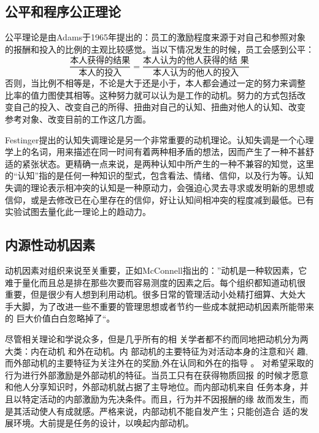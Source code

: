 \documentclass[12pt,a4paper]{ctexart}
\begin{document}
\subsection{公平和程序公正理论}
公平理论是由Adams于1965年提出的：员工的激励程度来源于对自己和参照对象
的报酬和投入的比例的主观比较感觉。当以下情况发生的时候，员工会感到公平：
$$\frac{\text{本人获得的结果}}{\text{本人的投入}} = \frac{\text{本人认为的他人获得的结
  果}}{\text{本人认为的他人的投入}}$$
否则，当比例不相等是，不论是大于还是小于，本人都会通过一定的努力来调整
比率的值力图使其相等。这种努力就可以认为是工作的动机。努力的方式包括改
变自己的投入、改变自己的所得、扭曲对自己的认知、扭曲对他人的认知、改变
参考对象、改变目前的工作这几方面\cite{adams1965ise}。

Festinger提出的认知失调理论是另一个非常重要的动机理论。认知失调是一个心理学上的名词，用来描述在同一时间有着两种相矛盾的想法，因而产生了一种不甚舒适的紧张状态。更精确一点来说，是两种认知中所产生的一种不兼容的知觉，这里的“认知”指的是任何一种知识的型式，包含看法、情绪、信仰，以及行为等。认知失调的理论表示相冲突的认知是一种原动力，会强迫心灵去寻求或发明新的思想或信仰，或是去修改已在心里存在的信仰，好让认知间相冲突的程度减到最低。已有实验试图去量化此一理论上的趋动力\cite{aronson1969tcd}。

\subsection{内源性动机因素}
动机因素对组织来说至关重要，正如McConnell指出的：”动机是一种软因素，它
难于量化而且总是排在那些次要而容易测度的因素之后。每个组织都知道动机很
重要，但是很少有人想到利用动机。很多日常的管理活动小处精打细算、大处大
手大脚，为了改进一些不重要的管理思想或者节约一些成本就把动机因素所能带来的
巨大价值白白忽略掉了“\cite{663801}。

尽管相关理论和学说众多，但是几乎所有的相
关学者都不约而同地把动机分为两大类：内在动机
和外在动机\cite{sansone2000iae}。内
部动机的主要特征为对活动本身的注意和兴
趣,而外部动机的主要特征为关注外在的奖励,外在认同和外在的指导
\cite{collins1999mac}。
对希望采取的行为进行外部激励是外部动机的特征。当员工只有在获得物质回报
的时候才愿意和他人分享知识时，外部动机就占据了主导地位。而内部动机来自
任务本身，并且以特定活动的内部激励为先决条件。而且，行为并不因报酬的缘
故而发生，而是其活动使人有成就感。严格来说，内部动机不能自发产生；只能创造合
适的发展环境。大前提是任务的设计，以唤起内部动机。
\cite{KaiMertins2003}
\end{document}
